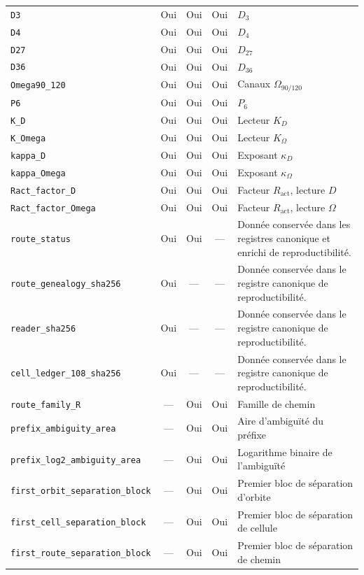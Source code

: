 \begin{longtable}{p{}ccc p{}}
\nolinkurl{D3} & Oui & Oui & Oui & \(D_3\) \\
\nolinkurl{D4} & Oui & Oui & Oui & \(D_4\) \\
\nolinkurl{D27} & Oui & Oui & Oui & \(D_{27}\) \\
\nolinkurl{D36} & Oui & Oui & Oui & \(D_{36}\) \\
\nolinkurl{Omega90_120} & Oui & Oui & Oui & Canaux \(\Omega_{90/120}\) \\
\nolinkurl{P6} & Oui & Oui & Oui & \(P_6\) \\
\nolinkurl{K_D} & Oui & Oui & Oui & Lecteur \(K_D\) \\
\nolinkurl{K_Omega} & Oui & Oui & Oui & Lecteur \(K_\Omega\) \\
\nolinkurl{kappa_D} & Oui & Oui & Oui & Exposant \(\kappa_D\) \\
\nolinkurl{kappa_Omega} & Oui & Oui & Oui & Exposant \(\kappa_\Omega\) \\
\nolinkurl{Ract_factor_D} & Oui & Oui & Oui & Facteur \(R_{\mathrm{act}}\), lecture \(D\) \\
\nolinkurl{Ract_factor_Omega} & Oui & Oui & Oui & Facteur \(R_{\mathrm{act}}\), lecture \(\Omega\) \\
\nolinkurl{route_status} & Oui & Oui & --- & Donnée conservée dans les registres canonique et enrichi de reproductibilité. \\
\nolinkurl{route_genealogy_sha256} & Oui & --- & --- & Donnée conservée dans le registre canonique de reproductibilité. \\
\nolinkurl{reader_sha256} & Oui & --- & --- & Donnée conservée dans le registre canonique de reproductibilité. \\
\nolinkurl{cell_ledger_108_sha256} & Oui & --- & --- & Donnée conservée dans le registre canonique de reproductibilité. \\
\nolinkurl{route_family_R} & --- & Oui & Oui & Famille de chemin \\
\nolinkurl{prefix_ambiguity_area} & --- & Oui & Oui & Aire d'ambiguïté du préfixe \\
\nolinkurl{prefix_log2_ambiguity_area} & --- & Oui & Oui & Logarithme binaire de l'ambiguïté \\
\nolinkurl{first_orbit_separation_block} & --- & Oui & Oui & Premier bloc de séparation d'orbite \\
\nolinkurl{first_cell_separation_block} & --- & Oui & Oui & Premier bloc de séparation de cellule \\
\nolinkurl{first_route_separation_block} & --- & Oui & Oui & Premier bloc de séparation de chemin \\

\end{longtable}
